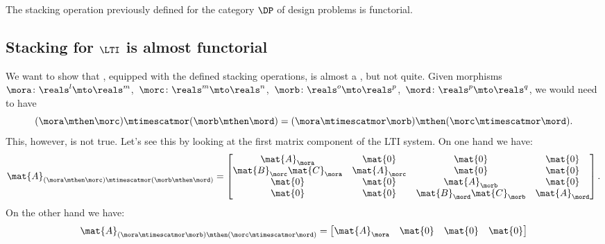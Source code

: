 \begin{example}
    The stacking operation previously defined for the category $\DP$ of design problems is functorial.
\end{example}

\subsection{Stacking for $\LTI$ is almost functorial}

\begin{example}
    We want to show that \LTI, equipped with the defined stacking operations, is almost a , but not quite.
    Given morphisms~$\mora\colon \reals^l\mto \reals^m$,~$\morc\colon \reals^m\mto \reals^n$,~$\morb\colon \reals^o\mto \reals^p$,~$\mord\colon \reals^p\mto \reals^q$, we would need to have
    \begin{equation*}
        (\mora \mthen \morc)
        \mtimescatmor (\morb\mthen \mord)=(\mora\mtimescatmor \morb)\mthen (\morc\mtimescatmor \mord).
    \end{equation*}
    This, however, is not true.
    Let's see this by looking at the first matrix component of the LTI system.
    On one hand we have:
    \begin{equation}\label{eq:checking-LTI-functorial-stacking-1}
        \mat{A}_{(\mora \mthen \morc)\mtimescatmor (\morb\mthen \mord)}=
        \begin{bmatrix}
            \mat{A}_\mora              & \mat{0}       & \mat{0}                    & \mat{0}       \\
            \mat{B}_\morc\mat{C}_\mora & \mat{A}_\morc & \mat{0}                    & \mat{0}       \\
            \mat{0}                    & \mat{0}       & \mat{A}_\morb              & \mat{0}       \\
            \mat{0}                    & \mat{0}       & \mat{B}_\mord\mat{C}_\morb & \mat{A}_\mord
        \end{bmatrix}.
    \end{equation}
    On the other hand we have:
    \begin{equation}\label{eq:checking-LTI-functorial-stacking-2}
        \mat{A}_{(\mora\mtimescatmor \morb)\mthen (\morc\mtimescatmor \mord)}=
        \begin{bmatrix}
            \mat{A}_\mora               & \mat{0}                     & \mat{0}       & \mat{0}       \\

\end{bmatrix}
\end{equation}
\end{example}
